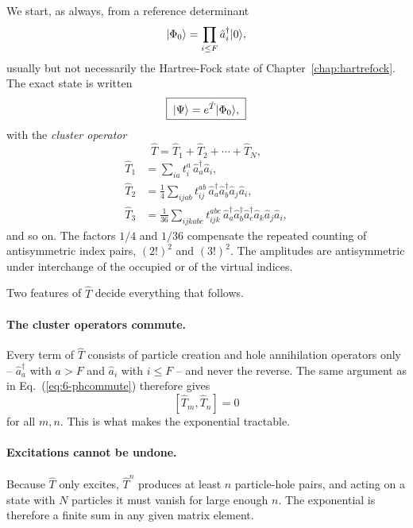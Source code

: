 We start, as always, from a reference determinant
\begin{equation}
  \vert \Phi_0 \rangle = \prod_{i\le F}\hat{a}^{\dagger}_i\vert 0 \rangle,
  \label{eq:10-reference}
\end{equation}
usually but not necessarily the Hartree-Fock state of
Chapter~\ref{chap:hartrefock}.  The exact state is written
\begin{equation}
  \boxed{\;
  \vert \Psi \rangle = e^{\hat{T}}\vert \Phi_0 \rangle,
  \;}
  \label{eq:10-ansatz}
\end{equation}
with the \emph{cluster operator}
\begin{equation}
  \hat{T} = \hat{T}_1 + \hat{T}_2 + \cdots + \hat{T}_N,
  \label{eq:10-clusteroperator}
\end{equation}
\begin{align}
  \hat{T}_1 &= \sum_{ia}t_i^a\,\hat{a}^{\dagger}_a\hat{a}_i,
  \label{eq:10-T1}\\
  \hat{T}_2 &= \frac{1}{4}\sum_{ijab}t_{ij}^{ab}\,
    \hat{a}^{\dagger}_a\hat{a}^{\dagger}_b\hat{a}_j\hat{a}_i,
  \label{eq:10-T2}\\
  \hat{T}_3 &= \frac{1}{36}\sum_{ijkabc}t_{ijk}^{abc}\,
    \hat{a}^{\dagger}_a\hat{a}^{\dagger}_b\hat{a}^{\dagger}_c
    \hat{a}_k\hat{a}_j\hat{a}_i,
  \label{eq:10-T3}
\end{align}
and so on.  The factors $1/4$ and $1/36$ compensate the repeated counting of
antisymmetric index pairs, $(2!)^2$ and $(3!)^2$.  The amplitudes are
antisymmetric under interchange of the occupied or of the virtual indices.

Two features of $\hat{T}$ decide everything that follows.

\paragraph{The cluster operators commute.}
Every term of $\hat{T}$ consists of particle creation and hole annihilation
operators only -- $\hat{a}^{\dagger}_a$ with $a>F$ and $\hat{a}_i$ with
$i\le F$ -- and never the reverse.  The same argument as in
Eq.~(\ref{eq:6-phcommute}) therefore gives
\begin{equation}
  \left[\hat{T}_m,\hat{T}_n\right] = 0
  \label{eq:10-Tcommute}
\end{equation}
for all $m,n$.  This is what makes the exponential tractable.

\paragraph{Excitations cannot be undone.}
Because $\hat{T}$ only excites, $\hat{T}^{n}$ produces at least $n$
particle-hole pairs, and acting on a state with $N$ particles it must vanish
for large enough $n$.  The exponential is therefore a finite sum in any given
matrix element.

